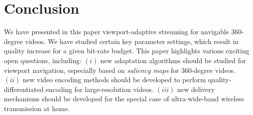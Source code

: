 \section{Conclusion}
\label{sec:conclusion}

We have presented in this paper viewport-adaptive streaming for
navigable 360-degree videos. We have studied certain key parameter settings,
which result in quality increase for a given bit-rate budget. This
paper highlights various exciting open questions, including: $(i)$ new
adaptation algorithms should be studied for viewport navigation,
especially based on \emph{saliency maps} for 360-degree videos. $(ii)$
new video encoding methods should be developed to perform
quality-differentiated encoding for large-resolution videos. $(iii)$
new delivery mechanisms should be developed for the special
case of ultra-wide-band wireless transmission at home.
